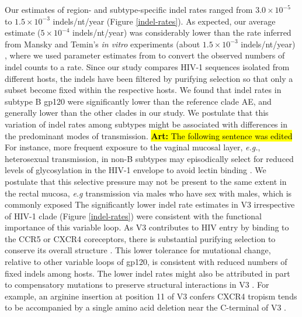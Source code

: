 \documentclass[12pt]{article}
\newcommand{\todo}[2]{\hl{\textbf{#1:} #2}}
\begin{document}
Our estimates of region- and subtype-specific indel rates ranged from $3.0\times 10^{-5}$ to $1.5\times 10^{-3}$ indels/nt/year (Figure \ref{indel-rates}). 
As expected, our average estimate ($5\times 10^{-4}$ indels/nt/year) was considerably lower than the rate inferred from Mansky and Temin's \textit{in vitro} experiments (about $1.5\times 10^{-3}$ indels/nt/year) \citep{Mansky:1995} , where we used parameter estimates from \citet{Perelson:1999} to convert the observed numbers of indel counts to a rate.
Since our study compares HIV-1 sequences isolated from different hosts, the indels have been filtered by purifying selection so that only a subset become fixed within the respective hosts.
We found that indel rates in subtype B gp120 were significantly lower than the reference clade AE, and generally lower than the other clades in our study.
We postulate that this variation of indel rates among subtypes might be associated with differences in the predominant modes of transmission.
\todo{Art}{The following sentence was edited}
For instance, more frequent exposure to the vaginal mucosal layer, \textit{e.g.}, heterosexual transmission, in non-B subtypes may episodically select for reduced levels of glycosylation in the HIV-1 envelope to avoid lectin binding \citep{joseph2015bott]lenecks}.
We postulate that this selective pressure may not be present to the same extent in the rectal mucosa, \textit{e.g} transmission via males who have sex with males, which is commonly exposed 
The significantly lower indel rate estimates in V3 irrespective of HIV-1 clade (Figure \ref{indel-rates}) were consistent with the functional importance of this variable loop. 
As V3 contributes to HIV entry by binding to the CCR5 or CXCR4 coreceptors, there is substantial purifying selection to conserve its overall structure \citep{Liang:1999, Jiang:2010}. 
This lower tolerance for mutational change, relative to other variable loops of gp120, is consistent with reduced numbers of fixed indels among hosts. 
The lower indel rates might also be attributed in part to compensatory mutations to preserve structural interactions in V3 \citep{poon2007evolutionary}.
For example, an arginine insertion at position 11 of V3 confers CXCR4 tropism tends to be accompanied by a single amino acid deletion near the C-terminal of V3 \citep{Tsuchiya:2013}.




\end{document}

